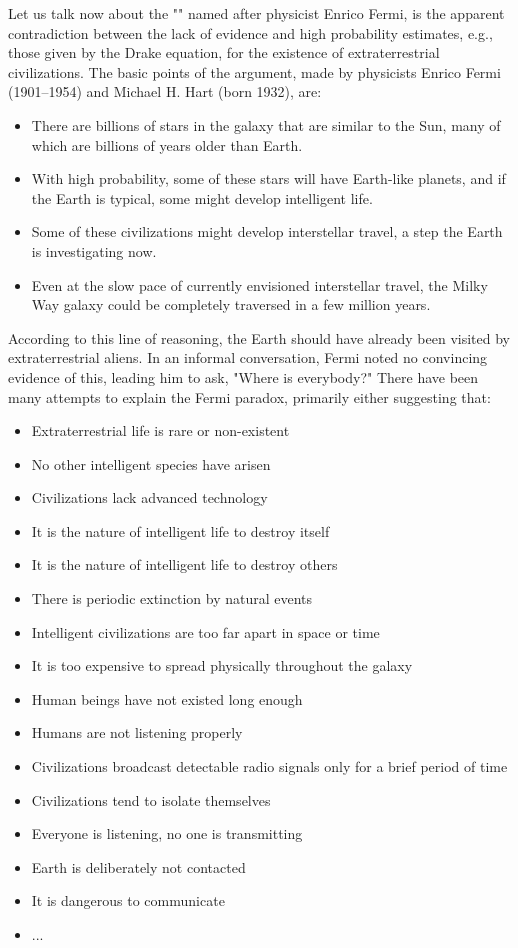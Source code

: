 	Let us talk now about the ""  named after physicist Enrico Fermi, is the apparent contradiction between the lack of evidence and high probability estimates, e.g., those given by the Drake equation, for the existence of extraterrestrial civilizations. The basic points of the argument, made by physicists Enrico Fermi (1901–1954) and Michael H. Hart (born 1932), are:
	\begin{itemize}
		\item There are billions of stars in the galaxy that are similar to the Sun, many of which are billions of years older than Earth.
		\item With high probability, some of these stars will have Earth-like planets, and if the Earth is typical, some might develop intelligent life.
		\item Some of these civilizations might develop interstellar travel, a step the Earth is investigating now.
		\item Even at the slow pace of currently envisioned interstellar travel, the Milky Way galaxy could be completely traversed in a few million years.
	\end{itemize}
	According to this line of reasoning, the Earth should have already been visited by extraterrestrial aliens. In an informal conversation, Fermi noted no convincing evidence of this, leading him to ask, "Where is everybody?" There have been many attempts to explain the Fermi paradox, primarily either suggesting that:
	\begin{itemize}
		\item Extraterrestrial life is rare or non-existent
		\item No other intelligent species have arisen
		\item Civilizations lack advanced technology
		\item It is the nature of intelligent life to destroy itself
		\item It is the nature of intelligent life to destroy others
		\item There is periodic extinction by natural events
		\item Intelligent civilizations are too far apart in space or time
		\item It is too expensive to spread physically throughout the galaxy
		\item Human beings have not existed long enough
		\item Humans are not listening properly
		\item Civilizations broadcast detectable radio signals only for a brief period of time
		\item Civilizations tend to isolate themselves
		\item Everyone is listening, no one is transmitting	
		\item Earth is deliberately not contacted
		\item It is dangerous to communicate
		\item ...
	\end{itemize}
	
